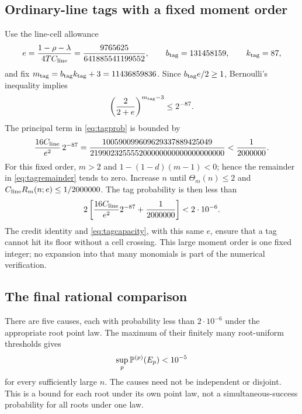 \subsection{Ordinary-line tags with a fixed moment order}
Use the line-cell allowance
\[
 e=\frac{1-\rho-\lambda}{4TC_{\rm line}}
 =\frac{9765625}{641885541199552},\qquad
 b_{\rm tag}=131458159,\qquad k_{\rm tag}=87,
\]
and fix \(m_{\rm tag}=b_{\rm tag}k_{\rm tag}+3=11436859836\).
Since \(b_{\rm tag}e/2\ge1\), Bernoulli's inequality implies
\[
 \left(\frac2{2+e}\right)^{m_{\rm tag}-3}\le2^{-87}.
\]
The principal term in \eqref{eq:tagprob} is bounded by
\begin{equation}\label{eq:fixedtagbudget}
 \frac{16C_{\rm line}}{e^2}\,2^{-87}
 =\frac{100590099609629337889425049}
 {219902325555200000000000000000000}
 <\frac1{2000000}.
\end{equation}
For this fixed order, \(m>2\) and \(1-(1-d)(m-1)<0\); hence
the remainder in \eqref{eq:tagremainder} tends to zero. Increase
\(n\) until \(\Theta_m(n)\le2\) and
\(C_{\rm line}R_m(n;e)\le1/2000000\). The tag probability is then
less than
\[
 2\left[\frac{16C_{\rm line}}{e^2}2^{-87}
          +\frac1{2000000}\right]<2\cdot10^{-6}.
\]
The credit identity and \eqref{eq:tagcapacity}, with this same
\(e\), ensure that a tag cannot hit its floor without a cell crossing.
This large moment order is one fixed integer; no expansion into
that many monomials is part of the numerical verification.

\subsection{The final rational comparison}
There are five causes, each with probability less than \(2\cdot10^{-6}\)
under the appropriate root point law. The maximum of their finitely
many root-uniform thresholds gives
\begin{equation}\label{eq:fixedfivebudget}
 \sup_p\mathbb P^{(p)}(E_p)<10^{-5}
\end{equation}
for every sufficiently large \(n\). The causes need not be independent
or disjoint. This is a bound for each root under its own point law,
not a simultaneous-success probability for all roots under one law.

